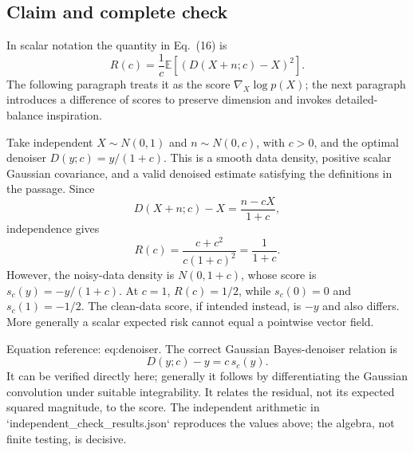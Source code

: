\documentclass[10pt]{article}
\begin{document}
\subsection*{Claim and complete check}
In scalar notation the quantity in Eq. (16) is \[R(c)=\frac{1}{c}\mathbb E\left[(D(X+n;c)-X)^2\right].\] The following paragraph treats it as the score \(\nabla_X\log p(X)\); the next paragraph introduces a difference of scores to preserve dimension and invokes detailed-balance inspiration.\par
Take independent \(X\sim N(0,1)\) and \(n\sim N(0,c)\), with \(c>0\), and the optimal denoiser \(D(y;c)=y/(1+c)\). This is a smooth data density, positive scalar Gaussian covariance, and a valid denoised estimate satisfying the definitions in the passage. Since \[D(X+n;c)-X=\frac{n-cX}{1+c},\] independence gives \[R(c)=\frac{c+c^2}{c(1+c)^2}=\frac1{1+c}.\] However, the noisy-data density is \(N(0,1+c)\), whose score is \(s_c(y)=-y/(1+c)\). At \(c=1\), \(R(c)=1/2\), while \(s_c(0)=0\) and \(s_c(1)=-1/2\). The clean-data score, if intended instead, is \(-y\) and also differs. More generally a scalar expected risk cannot equal a pointwise vector field.\par
Equation reference: eq:denoiser. The correct Gaussian Bayes-denoiser relation is \[
 D(y;c)-y=c\,s_c(y).\] It can be verified directly here; generally it follows by differentiating the Gaussian convolution under suitable integrability. It relates the residual, not its expected squared magnitude, to the score. The independent arithmetic in `independent\_check\_results.json` reproduces the values above; the algebra, not finite testing, is decisive.\par
\end{document}
